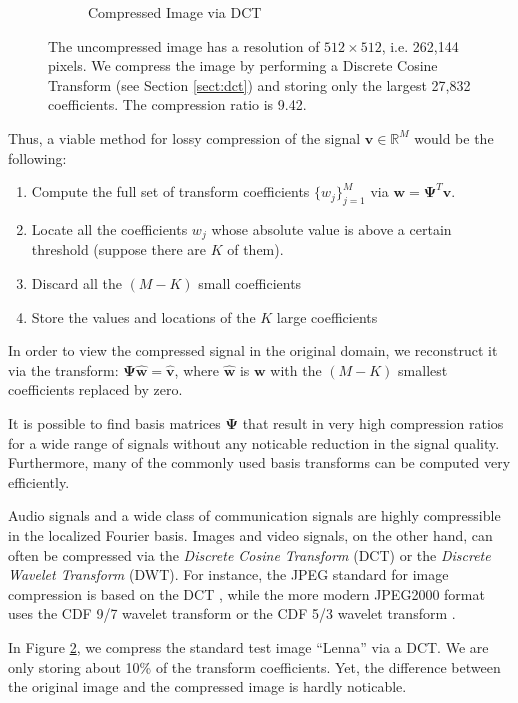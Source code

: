 \begin{figure}
\begin{subfigure}[b]{0.4\textwidth}
    \caption{Compressed Image via DCT}
    \label{fig:ch2:lenna_dct}
  \end{subfigure}
  \caption[Image Compression using DCT]{The uncompressed image has a resolution of $512\times 512$, i.e. 262,144 pixels. We compress the image by performing a Discrete Cosine Transform (see Section \ref{sect:dct}) and storing only the largest 27,832 coefficients. The compression ratio is 9.42.}
  \label{fig:ch2:dct}
\end{figure}

Thus, a viable method for lossy compression of the signal $\bm v \in \mathbb{R}^M$ would be the following:
\begin{enumerate}
\item Compute the full set of transform coefficients $\{w_j\}_{j=1}^M$ via $\bm w = \bm\Psi^T\bm v$.
\item Locate all the coefficients $w_j$ whose absolute value is above a certain threshold (suppose there are $K$ of them). 
\item Discard all the $(M-K)$ small coefficients
\item Store the values and locations of the $K$ large coefficients
\end{enumerate}
In order to view the compressed signal in the original domain, we reconstruct it via the transform: $\bm\Psi\bm{\hat w} = \bm{\hat v}$, where $\bm{\hat w}$ is $\bm w$ with the $(M-K)$ smallest coefficients replaced by zero.

It is possible to find basis matrices $\bm\Psi$ that result in very high compression ratios for a wide range of signals without any noticable reduction in the signal quality.
Furthermore, many of the commonly used basis transforms can be computed very efficiently.

Audio signals and a wide class of communication signals are highly compressible in the localized Fourier basis.
Images and video signals, on the other hand, can often be compressed via the \emph{Discrete Cosine Transform} (DCT) or the \emph{Discrete Wavelet Transform} (DWT).
For instance, the JPEG standard for image compression is based on the DCT \cite{wallace1992}, while the more modern JPEG2000 format uses the CDF 9/7 wavelet transform or the CDF 5/3 wavelet transform \cite{usevitch2001}.

In Figure \ref{fig:ch2:dct}, we compress the standard test image ``Lenna'' via a DCT. 
We are only storing about 10\% of the transform coefficients.
Yet, the difference between the original image and the compressed image is hardly noticable.

